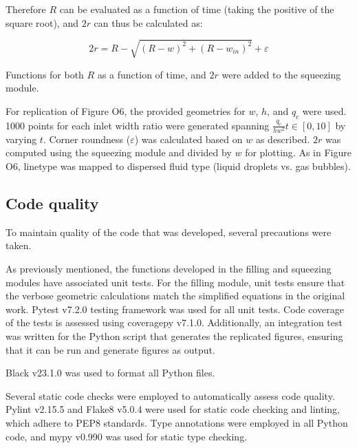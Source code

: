 Therefore $R$ can be evaluated as a function of time (taking the positive of the square root), and
$2r$ can thus be calculated as:

\begin{equation}
  2r = R - \sqrt{\left(R - w\right)^2 + \left(R - w_{in}\right)^2} + \varepsilon
\end{equation}

Functions for both $R$ as a function of time, and $2r$ were added
to the squeezing module.

For replication of Figure O6, the provided geometries for $w$, $h$, and $q_c$ were used. 1000
points for each inlet width ratio were generated spanning $\frac{q_c}{hw^2}t \in [0,10]$ by varying 
$t$. Corner roundness ($\varepsilon$) was calculated based on $w$ as described. $2r$ was
computed using the squeezing module and divided by $w$ for plotting. As in Figure O6, linetype
was mapped to dispersed fluid type (liquid droplets vs. gas bubbles).

\subsection{Code quality}

To maintain quality of the code that was developed, several precautions were taken.

As previously mentioned, the functions developed in the filling and squeezing modules
have associated unit tests. For the filling module, unit tests ensure that the verbose
geometric calculations match the simplified equations in the original work.
Pytest\supercite{krekel_pytest_2004} v7.2.0 testing framework was used for all unit tests.
Code coverage of the tests is assessed using coveragepy\supercite{batchelder_coveragepy_nodate} v7.1.0.
Additionally, an integration test was written for the Python script that generates the
replicated figures, ensuring that it can be run and generate figures as output.

Black\supercite{langa_black_2018} v23.1.0 was used to format all Python files.

Several static code checks were employed to automatically assess code quality.
Pylint\supercite{thenault_pylint_2001} v2.15.5 and
Flake8\supercite{ziade_flake8_2011} v5.0.4 were used for static code checking
and linting, which adhere to PEP8\supercite{van_rossum_pep_2001} standards. Type annotations were employed
in all Python code, and mypy\supercite{lehtosalo_mypy_2012} v0.990 was used for
static type checking.

